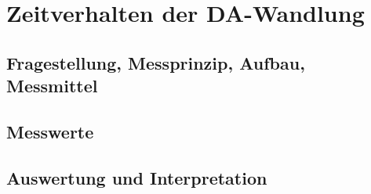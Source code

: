 %
%
\chapter{Zeitverhalten der DA-Wandlung}
\label{chap:VERSUCH_4}
 
\section{Fragestellung, Messprinzip, Aufbau, Messmittel}
\label{chap:VERSUCH_4_FRAGESTELLUNG}
\section{Messwerte}
\label{chap:VERSUCH_4_MESSWERTE}

\section{Auswertung und Interpretation}
\label{chap:VERSUCH_4_AUSWERTUNG}
